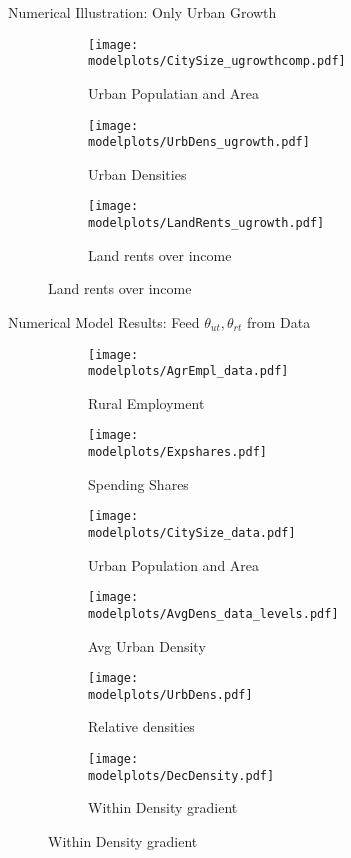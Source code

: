 \documentclass[aspectratio=169]{beamer}
\begin{document}
\begin{v75mins}
\begin{frame}{Numerical Illustration: Only Urban Growth}
\begin{figure}
		\begin{subfigure}[t]{0.32\textwidth}
			\begin{centering}
				\texttt{[image: \\modelplots/CitySize\_ugrowthcomp.pdf]}
				\caption{Urban Populatian and Area}
			\end{centering}
		\end{subfigure}
		\hfill
		\begin{subfigure}[t]{0.32\textwidth}
			\begin{centering}
				\texttt{[image: \\modelplots/UrbDens\_ugrowth.pdf]}			
				\caption{Urban Densities}
			\end{centering}
		\end{subfigure}
		\hfill
		\begin{subfigure}[t]{0.32\textwidth}
			\begin{centering}
				\texttt{[image: \\modelplots/LandRents\_ugrowth.pdf]}
				\caption{Land rents over income}
			\end{centering}
		\end{subfigure}
	\end{figure}
	\end{frame}
\end{v75mins}

\begin{frame}{Numerical Model Results: Feed $\theta_{ut},\theta_{rt}$ from Data}
	\begin{figure}
		\begin{subfigure}[t]{0.32\textwidth}
			\centering
			\texttt{[image: \\modelplots/AgrEmpl\_data.pdf]}
			\caption{Rural Employment}
			\label{fig:sub1}
		\end{subfigure}\hskip 1mm%
		\begin{subfigure}[t]{0.32\textwidth}
			\centering
			\texttt{[image: \\modelplots/Expshares.pdf]}
			\label{fig:sub2}
			\caption{Spending Shares}
		\end{subfigure}
		\begin{subfigure}[t]{0.32\textwidth}
			\centering
			\texttt{[image: \\modelplots/CitySize\_data.pdf]}
			\label{fig:sub2}
			\caption{Urban Population and Area}
		\end{subfigure}

		\begin{subfigure}[t]{0.32\textwidth}
			\centering
			\texttt{[image: \\modelplots/AvgDens\_data\_levels.pdf]}
			\caption{Avg Urban Density}
			\label{fig:sub1}
		\end{subfigure}\hskip 1mm%
		\begin{subfigure}[t]{0.32\textwidth}
			\centering
			\texttt{[image: \\modelplots/UrbDens.pdf]}
			\label{fig:sub2}
			\caption{Relative densities}
		\end{subfigure}
		\begin{subfigure}[t]{0.32\textwidth}
			\centering
			\texttt{[image: \\modelplots/DecDensity.pdf]}
			\label{fig:sub2}
			\caption{Within Density gradient}
		\end{subfigure}
	\end{figure}
\end{frame}
\end{document}
